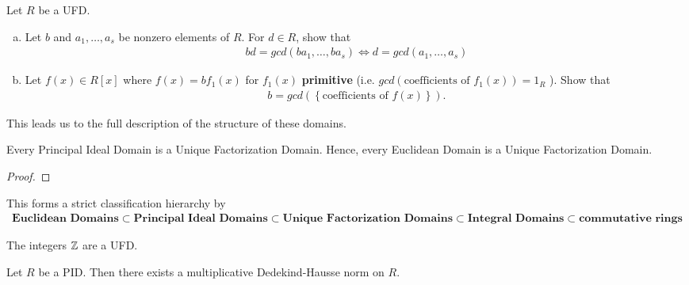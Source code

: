 \documentclass{memoir}
\begin{document}
\begin{hw}
	Let \(R\) be a UFD.
	\begin{enumerate}[(a).]
		\item Let \(b\) and \(a_1,\ldots,a_s\) be nonzero elements of \(R\). For \(d \in R\), show that
			\begin{align*}
				bd = gcd(ba_1,\ldots,ba_s) \iff d = gcd(a_1,\ldots,a_s)
			\end{align*}
		\item Let \(f(x) \in R[x]\) where \(f(x) = bf_1(x)\) for \(f_1(x)\) \textbf{primitive} (i.e. \(gcd(\text{coefficients of }f_1(x)) = 1_R\) ). Show that
			\begin{align*}
				b = gcd(\left\{ \text{coefficients of }f(x) \right\} ).
			\end{align*}
	\end{enumerate}
\end{hw}

This leads us to the full description of the structure of these domains.

\begin{thm}
	Every Principal Ideal Domain is a Unique Factorization Domain. Hence, every Euclidean Domain is a Unique Factorization Domain.
\end{thm}
\begin{proof}
	
\end{proof}

This forms a strict classification hierarchy by
\begin{align*}
	\textbf{Euclidean Domains} \subset \textbf{Principal Ideal Domains} \subset \textbf{Unique Factorization Domains} \subset \textbf{Integral Domains} \subset \textbf{commutative rings}
\end{align*}

\begin{cor}
	The integers \(\mathbb{Z}\) are a UFD.
\end{cor}

\begin{cor}
	Let \(R\) be a PID. Then there exists a multiplicative Dedekind-Hausse norm on \(R\).
\end{cor}
\end{document}

